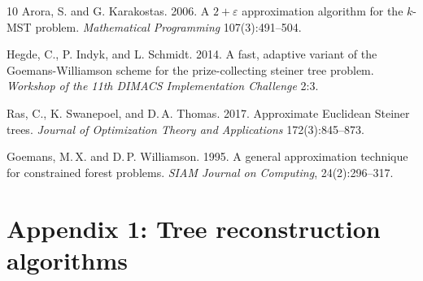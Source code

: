 \documentclass[12pt]{article}
\begin{document}
\begin{thebibliography}{10}
Arora, S. and G. Karakostas. 2006. A $2+\varepsilon$ approximation algorithm for the $k$-MST problem. {\em Mathematical Programming} 107(3):491--504.

Hegde, C., P. Indyk, and L. Schmidt. 2014. A fast, adaptive variant of the Goemans-Williamson scheme for the prize-collecting steiner tree problem. {\em Workshop of the 11th DIMACS Implementation Challenge} 2:3.

Ras, C., K. Swanepoel, and D.\,A. Thomas. 2017. Approximate Euclidean Steiner trees. {\em Journal of Optimization Theory and Applications} 172(3):845--873.

Goemans, M.\,X.  and D.\,P. Williamson. 1995. A general approximation technique for constrained forest problems. {\em SIAM Journal on Computing}, 24(2):296--317.
\end{thebibliography}
\makeatletter
\newcommand{\manuallabel}[2]{\def\@currentlabel{#2}\label{#1}}
\makeatother
\manuallabel{alg_general}{1}
\manuallabel{alg_pcst}{2}
\manuallabel{alg_rec_pcst}{4}

\clearpage
\newcommand{\lp}{\bigl(}
\newcommand{\rp}{\bigr)}
\section*{Appendix 1: Tree reconstruction algorithms}
\end{document}
